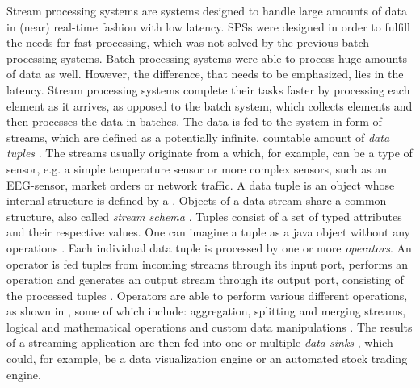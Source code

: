         \quad Stream processing systems are systems designed to handle large amounts of data in (near) real-time fashion with low latency.
        SPSs were designed in order to fulfill the needs for fast processing, which was not solved by the previous batch processing systems.
        Batch processing systems were able to process huge amounts of data as well. However, the difference, that needs to be emphasized, lies in the latency.
        Stream processing systems complete their tasks faster by processing each element as it arrives, as opposed to the batch system, which collects elements 
        and then processes the data in batches.
        The data is fed to the system in form of streams, which are defined as a potentially infinite, countable amount of \textit{data tuples} \cite[p. 95]{Panigati2015}. 
        The streams usually originate from a  \cite[p. 45]{fundamentals} which, for example, can be a type of sensor, e.g. a simple temperature sensor or more complex sensors, 
        such as an EEG-sensor, market orders or network traffic.
        A data tuple is an object whose internal structure is defined by a  \cite[p. 46]{fundamentals}. 
        Objects of a data stream share a common structure, also called \textit{stream schema} \cite[p. 46]{fundamentals}.
        Tuples consist of a set of typed attributes and their respective values. One can imagine a tuple as a java object without any operations \cite[p. 46]{fundamentals}.
        Each individual data tuple is processed by one or more \textit{operators}.
        An operator is fed tuples from incoming streams through its input port, performs an operation and generates an output stream through its output port, 
        consisting of the processed tuples \cite[p. 50]{fundamentals}. Operators are able to perform various different operations, 
        as shown in \cite[p. 49]{fundamentals}, some of which include: aggregation, splitting and merging streams, 
        logical and mathematical operations and custom data manipulations \cite[p. 49]{fundamentals}.
        The results of a streaming application are then fed into one or multiple \textit{data sinks} \cite[p. 45]{fundamentals}, which could, for example, be a data visualization engine 
        or an automated stock trading engine.
        

